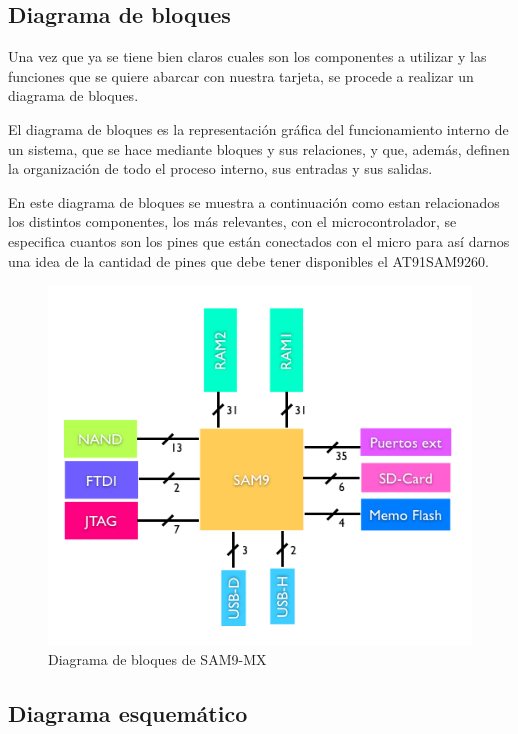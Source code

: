 \subsection{Diagrama de bloques}

Una vez que ya se tiene bien claros cuales son los componentes a utilizar y las funciones que se quiere abarcar con nuestra tarjeta, se procede a realizar un diagrama de bloques.\medskip

El diagrama de bloques es la representaci\'on gr\'afica del funcionamiento interno de un sistema, que se hace mediante bloques y sus relaciones, y que, adem\'as, definen la organizaci\'on de todo el proceso interno, sus entradas y sus salidas.\medskip

En este diagrama de bloques se muestra a continuaci\'on como estan relacionados los distintos componentes, los m\'as relevantes, con el microcontrolador, se especifica cuantos son los pines que est\'an conectados con el micro para as\'i darnos una idea de la cantidad de pines que debe tener disponibles el AT91SAM9260.

\begin{figure}[H]
\centering
\includegraphics[scale=0.8]{diagrama_bloques}
\caption{Diagrama de bloques de SAM9-MX}\label{fig:diagrama_bloques}
\end{figure}

\subsection{Diagrama esquem\'atico}

